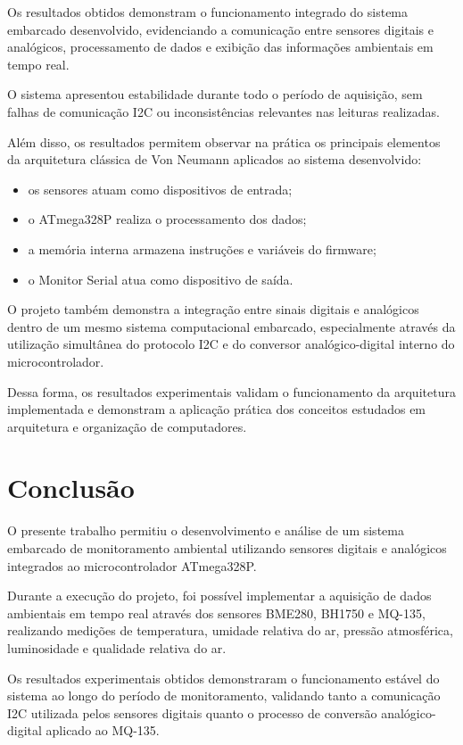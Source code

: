 \documentclass[a4paper,12pt]{article}
\begin{document}
Os resultados obtidos demonstram o funcionamento integrado do sistema embarcado desenvolvido, evidenciando a comunicação entre sensores digitais e analógicos, processamento de dados e exibição das informações ambientais em tempo real.

O sistema apresentou estabilidade durante todo o período de aquisição, sem falhas de comunicação I2C ou inconsistências relevantes nas leituras realizadas.

Além disso, os resultados permitem observar na prática os principais elementos da arquitetura clássica de Von Neumann aplicados ao sistema desenvolvido:
\begin{itemize}
    \item os sensores atuam como dispositivos de entrada;
    \item o ATmega328P realiza o processamento dos dados;
    \item a memória interna armazena instruções e variáveis do firmware;
    \item o Monitor Serial atua como dispositivo de saída.
\end{itemize}

O projeto também demonstra a integração entre sinais digitais e analógicos dentro de um mesmo sistema computacional embarcado, especialmente através da utilização simultânea do protocolo I2C e do conversor analógico-digital interno do microcontrolador.

Dessa forma, os resultados experimentais validam o funcionamento da arquitetura implementada e demonstram a aplicação prática dos conceitos estudados em arquitetura e organização de computadores.

\section{Conclusão}

O presente trabalho permitiu o desenvolvimento e análise de um sistema embarcado de monitoramento ambiental utilizando sensores digitais e analógicos integrados ao microcontrolador ATmega328P.

Durante a execução do projeto, foi possível implementar a aquisição de dados ambientais em tempo real através dos sensores BME280, BH1750 e MQ-135, realizando medições de temperatura, umidade relativa do ar, pressão atmosférica, luminosidade e qualidade relativa do ar.

Os resultados experimentais obtidos demonstraram o funcionamento estável do sistema ao longo do período de monitoramento, validando tanto a comunicação I2C utilizada pelos sensores digitais quanto o processo de conversão analógico-digital aplicado ao MQ-135.
\end{document}

